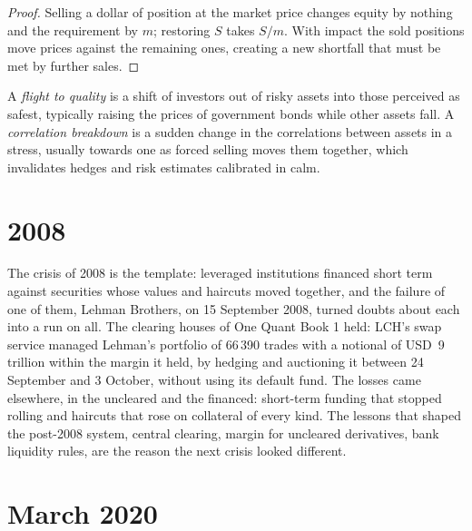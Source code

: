 \begin{proof}
Selling a dollar of position at the market price changes equity by nothing and the requirement by $m$; restoring $S$ takes $S/m$. With impact the sold
positions move prices against the remaining ones, creating a new shortfall that must be met by further sales.
\end{proof}

\begin{definition}\label{def:m3:when-markets-break-together:flight}
A \emph{flight to quality} is a shift of investors out of risky assets into those perceived as safest, typically raising the
prices of government bonds while other assets fall. A \emph{correlation breakdown} is a sudden change in the correlations
between assets in a stress, usually towards one as forced selling moves them together, which invalidates hedges and risk estimates calibrated in calm.
\end{definition}

\section{2008}

The crisis of 2008 is the template: leveraged institutions financed short term against securities whose values and haircuts moved together, and the
failure of one of them, Lehman Brothers, on 15 September 2008, turned doubts about each into a run on all. The clearing houses of One Quant Book 1 held:
LCH's swap service managed Lehman's portfolio of 66\,390 trades with a notional of USD~9 trillion within the margin it held, by hedging and auctioning it
between 24 September and 3 October, without using its default fund. The losses came elsewhere, in the uncleared and the financed: short-term funding that stopped rolling
and haircuts that rose on collateral of every kind. The
lessons that shaped the post-2008 system, central clearing, margin for uncleared derivatives, bank liquidity rules, are the reason the next crisis looked
different.

\section{March 2020}

